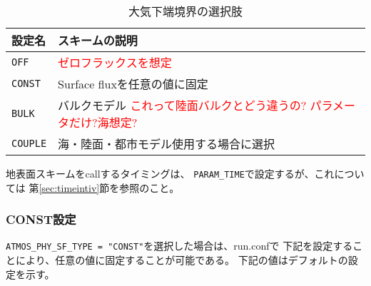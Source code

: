 \begin{table}[h]
\begin{center}
  \caption{大気下端境界の選択肢}
  \label{tab:nml_atm_sf}
  \begin{tabularx}{150mm}{lX} \hline
    \rowcolor[gray]{0.9}  設定名 & スキームの説明              \\ \hline
      \verb|OFF|     & \textcolor{red}{ゼロフラックスを想定}   \\
      \verb|CONST|   & Surface fluxを任意の値に固定             \\ %
      \verb|BULK|    & バルクモデル \textcolor{red}{これって陸面バルクとどう違うの? パラメータだけ?海想定?}  \\
      \verb|COUPLE|  & 海・陸面・都市モデル使用する場合に選択   \\
    \hline
  \end{tabularx}
\end{center}
\end{table}

地表面スキームをcallするタイミングは、
\verb|PARAM_TIME|で設定するが、これについては
第\ref{sec:timeintiv}節を参照のこと。


\subsubsection{CONST設定}
\verb|ATMOS_PHY_SF_TYPE = "CONST"|を選択した場合は、run.confで
下記を設定することにより、任意の値に固定することが可能である。
下記の値はデフォルトの設定を示す。\\

